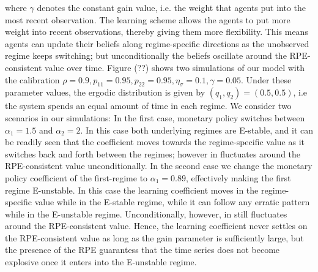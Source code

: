 \documentclass[12pt,reqno]{article}
\numberwithin{equation}{section}
\begin{document}
where $\gamma$ denotes the constant gain value, i.e. the weight that agents put into the most recent observation. The learning scheme allows the agents to put more weight into recent observations, thereby giving them more flexibility. This means agents can update their beliefs along regime-specific directions as the unobserved regime keeps switching; but unconditionally the beliefs oscillate around the RPE-consistent value over time. Figure (??) shows two simulations of our model with the calibration $\rho = 0.9, p_{11}=0.95, p_{22}= 0.95, \eta_{\sigma} = 0.1, \gamma=0.05 $. Under these parameter values, the ergodic distribution is given by $(q_1,q_2)=(0.5, 0.5) $, i.e the system spends an equal amount of time in each regime. We consider two scenarios in our simulations: In the first case, monetary policy switches between $\alpha_1=1.5$ and $\alpha_2 = 2 $. In this case both underlying regimes are E-stable, and it can be readily seen that the coefficient moves towards the regime-specific value as it switches back and forth between the regimes; however in fluctuates around the RPE-consistent value unconditionally. In the second case we change the monetary policy coefficient of the first-regime to $\alpha_1=0.89$, effectively making the first regime E-unstable. In this case the learning coefficient moves in the regime-specific value while in the E-stable regime, while it can follow any erratic pattern while in the E-unstable regime. Unconditionally, however, in still fluctuates around the RPE-consistent value. Hence, the learning coefficient never settles on the RPE-consistent value as long as the gain parameter is sufficiently large, but the presence of the RPE guarantess that the time series does not become explosive once it enters into the E-unstable regime. 
\end{document}
